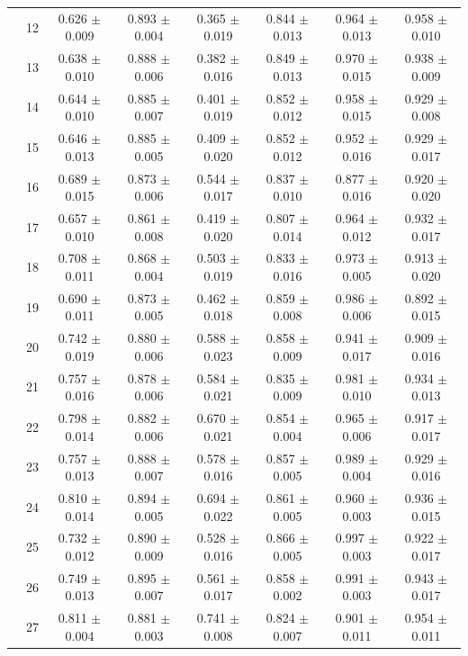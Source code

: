 \begin{longtable}{llcccccc}
 & 12 & 0.626 $\pm$ 0.009 & 0.893 $\pm$ 0.004 & 0.365 $\pm$ 0.019 & 0.844 $\pm$ 0.013 & 0.964 $\pm$ 0.013 & 0.958 $\pm$ 0.010 \\
 & 13 & 0.638 $\pm$ 0.010 & 0.888 $\pm$ 0.006 & 0.382 $\pm$ 0.016 & 0.849 $\pm$ 0.013 & 0.970 $\pm$ 0.015 & 0.938 $\pm$ 0.009 \\
 & 14 & 0.644 $\pm$ 0.010 & 0.885 $\pm$ 0.007 & 0.401 $\pm$ 0.019 & 0.852 $\pm$ 0.012 & 0.958 $\pm$ 0.015 & 0.929 $\pm$ 0.008 \\
 & 15 & 0.646 $\pm$ 0.013 & 0.885 $\pm$ 0.005 & 0.409 $\pm$ 0.020 & 0.852 $\pm$ 0.012 & 0.952 $\pm$ 0.016 & 0.929 $\pm$ 0.017 \\
 & 16 & 0.689 $\pm$ 0.015 & 0.873 $\pm$ 0.006 & 0.544 $\pm$ 0.017 & 0.837 $\pm$ 0.010 & 0.877 $\pm$ 0.016 & 0.920 $\pm$ 0.020 \\
 & 17 & 0.657 $\pm$ 0.010 & 0.861 $\pm$ 0.008 & 0.419 $\pm$ 0.020 & 0.807 $\pm$ 0.014 & 0.964 $\pm$ 0.012 & 0.932 $\pm$ 0.017 \\
 & 18 & 0.708 $\pm$ 0.011 & 0.868 $\pm$ 0.004 & 0.503 $\pm$ 0.019 & 0.833 $\pm$ 0.016 & 0.973 $\pm$ 0.005 & 0.913 $\pm$ 0.020 \\
 & 19 & 0.690 $\pm$ 0.011 & 0.873 $\pm$ 0.005 & 0.462 $\pm$ 0.018 & 0.859 $\pm$ 0.008 & 0.986 $\pm$ 0.006 & 0.892 $\pm$ 0.015 \\
 & 20 & 0.742 $\pm$ 0.019 & 0.880 $\pm$ 0.006 & 0.588 $\pm$ 0.023 & 0.858 $\pm$ 0.009 & 0.941 $\pm$ 0.017 & 0.909 $\pm$ 0.016 \\
 & 21 & 0.757 $\pm$ 0.016 & 0.878 $\pm$ 0.006 & 0.584 $\pm$ 0.021 & 0.835 $\pm$ 0.009 & 0.981 $\pm$ 0.010 & 0.934 $\pm$ 0.013 \\
 & 22 & 0.798 $\pm$ 0.014 & 0.882 $\pm$ 0.006 & 0.670 $\pm$ 0.021 & 0.854 $\pm$ 0.004 & 0.965 $\pm$ 0.006 & 0.917 $\pm$ 0.017 \\
 & 23 & 0.757 $\pm$ 0.013 & 0.888 $\pm$ 0.007 & 0.578 $\pm$ 0.016 & 0.857 $\pm$ 0.005 & 0.989 $\pm$ 0.004 & 0.929 $\pm$ 0.016 \\
 & 24 & 0.810 $\pm$ 0.014 & 0.894 $\pm$ 0.005 & 0.694 $\pm$ 0.022 & 0.861 $\pm$ 0.005 & 0.960 $\pm$ 0.003 & 0.936 $\pm$ 0.015 \\
 & 25 & 0.732 $\pm$ 0.012 & 0.890 $\pm$ 0.009 & 0.528 $\pm$ 0.016 & 0.866 $\pm$ 0.005 & 0.997 $\pm$ 0.003 & 0.922 $\pm$ 0.017 \\
 & 26 & 0.749 $\pm$ 0.013 & 0.895 $\pm$ 0.007 & 0.561 $\pm$ 0.017 & 0.858 $\pm$ 0.002 & 0.991 $\pm$ 0.003 & 0.943 $\pm$ 0.017 \\
 & 27 & 0.811 $\pm$ 0.004 & 0.881 $\pm$ 0.003 & 0.741 $\pm$ 0.008 & 0.824 $\pm$ 0.007 & 0.901 $\pm$ 0.011 & 0.954 $\pm$ 0.011 \\

\end{longtable}
